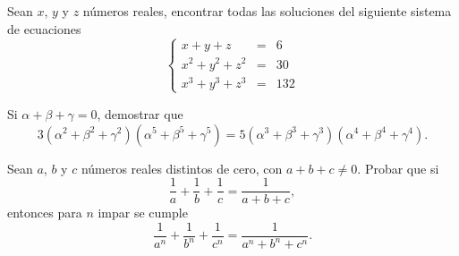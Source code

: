 \begin{problem}
    Sean $x$, $y$ y $z$ números reales, encontrar todas las soluciones del siguiente sistema de ecuaciones
    \[
        \left\{
        \begin{array}{rcl}
            x + y + z       & = & 6   \\
            x^2 + y^2 + z^2 & = & 30  \\
            x^3 + y^3 + z^3 & = & 132
        \end{array}
        \right.
    \]
\end{problem}

\begin{problem}
    Si $\alpha + \beta + \gamma = 0$, demostrar que
    \[3 (\alpha^2 + \beta^2 + \gamma^2) (\alpha^5 + \beta^5 + \gamma^5) = 5 (\alpha^3 + \beta^3 + \gamma^3) (\alpha^4 + \beta^4 + \gamma^4).\]
\end{problem}

\begin{problem}
    Sean $a$, $b$ y $c$ números reales distintos de cero, con $a + b + c \neq 0$.
    Probar que si
    \[\frac{1}{a} + \frac{1}{b} + \frac{1}{c} = \frac{1}{a + b + c},\]
    entonces para $n$ impar se cumple
    \[\frac{1}{a^n} + \frac{1}{b^n} + \frac{1}{c^n} = \frac{1}{a^n + b^n + c^n}.\]
\end{problem}